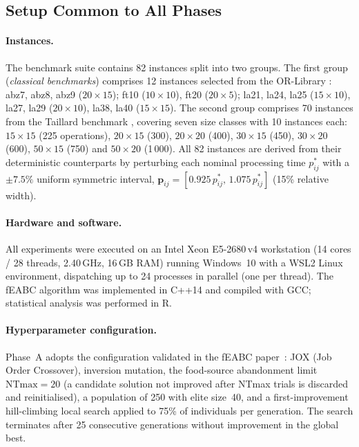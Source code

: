 \documentclass[preprint,12pt]{elsarticle}
\begin{document}
\subsection{Setup Common to All Phases}
\label{sec:setup}

\paragraph{Instances.} The benchmark suite contains 82 instances split into two groups. The first group (\emph{classical benchmarks}) comprises 12 instances selected from the OR-Library \cite{Beasley1990}: abz7, abz8, abz9 ($20\times15$); ft10 ($10\times10$), ft20 ($20\times5$); la21, la24, la25 ($15\times10$), la27, la29 ($20\times10$), la38, la40 ($15\times15$). The second group comprises 70 instances from the Taillard benchmark \cite{Taillard1993}, covering seven size classes with 10 instances each: $15\times15$ (225 operations), $20\times15$ (300), $20\times20$ (400), $30\times15$ (450), $30\times20$ (600), $50\times15$ (750) and $50\times20$ (1\,000). All 82 instances are derived from their deterministic counterparts by perturbing each nominal processing time $p_{ij}^{*}$ with a $\pm7.5\%$ uniform symmetric interval, $\mathbf{p}_{ij} = [0.925\,p_{ij}^{*},\, 1.075\,p_{ij}^{*}]$ (15\% relative width).

\paragraph{Hardware and software.} All experiments were executed on an Intel Xeon E5-2680\,v4 workstation (14 cores / 28 threads, 2.40\,GHz, 16\,GB RAM) running Windows~10 with a WSL2 Linux environment, dispatching up to 24 processes in parallel (one per thread). The fEABC algorithm was implemented in C++14 and compiled with GCC; statistical analysis was performed in R.

\paragraph{Hyperparameter configuration.}
Phase~A adopts the configuration validated in the fEABC paper~\cite{DiazFEABC2023}: JOX (Job Order Crossover), inversion mutation, the food-source abandonment limit $\text{NTmax}=20$ (a candidate solution not improved after NTmax trials is discarded and reinitialised), a population of 250 with elite size~40, and a first-improvement hill-climbing local search applied to 75\% of individuals per generation. The search terminates after 25 consecutive generations without improvement in the global best.
\end{document}
